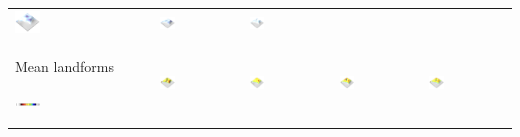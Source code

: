 \documentclass[prodmode,acmtochi]{acmsmall} %
\begin{document}
\begin{table}
{\begin{tabular}{m{} m{} m{} m{} m{}}
\includegraphics[width=0.19\textwidth]{images/render_3d/gis_students/stdev_regression_difference_series_1.png} &
\includegraphics[width=0.19\textwidth]{images/render_3d/gis_students/stdev_regression_difference_series_2.png} &
\includegraphics[width=0.19\textwidth]{images/render_3d/gis_students/stdev_regression_difference_series_3.png}\\
%
Mean landforms \par \vspace{0.5em} \includegraphics[width=0.19\textwidth]{images/legends/forms_legend.pdf} & 
\includegraphics[width=0.19\textwidth]{images/render_3d/gis_students/forms_1.png} &
\includegraphics[width=0.19\textwidth]{images/render_3d/gis_students/mean_forms_1.png} &
\includegraphics[width=0.19\textwidth]{images/render_3d/gis_students/mean_forms_2.png} &
\includegraphics[width=0.19\textwidth]{images/render_3d/gis_students/mean_forms_3.png}\\
%
\bottomrule
\end{tabular}}
\label{table:gis_students} 
\end{table}
\end{document}
